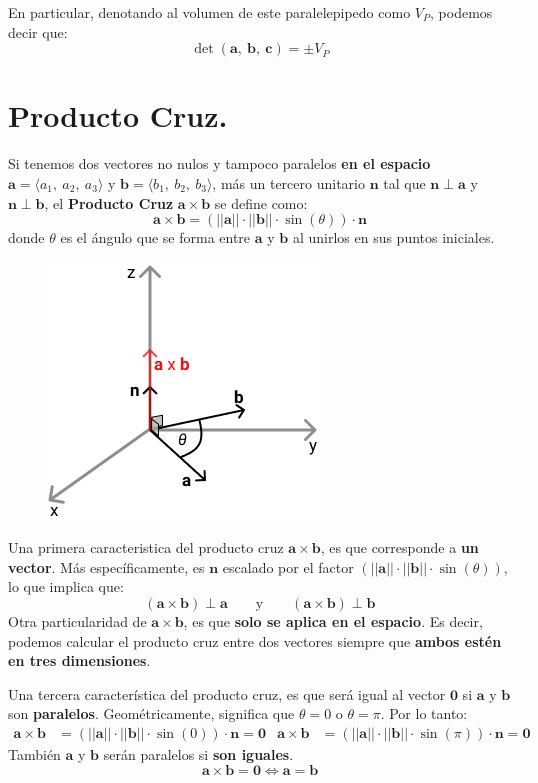 \documentclass[12pt]{article}
\begin{document}
En particular, denotando al volumen de este paralelepipedo como $V_{P}$, podemos decir que:
\[
  \det(\mathbf{a}, \ \mathbf{b}, \ \mathbf{c}) = \pm V_{P}
\]


\section{Producto Cruz.}

Si tenemos dos vectores no nulos y tampoco paralelos \textbf{en el espacio} $\mathbf{a} = \langle a_{1}, \ a_{2}, \ a_{3} \rangle$ y $\mathbf{b} = \langle b_{1}, \ b_{2}, \ b_{3} \rangle$, más un tercero unitario $\mathbf{n}$ tal que $\mathbf{n} \perp \mathbf{a}$ y $\mathbf{n} \perp \mathbf{b}$, el \textbf{Producto Cruz} $\mathbf{a} \times \mathbf{b}$ se define como:
\[
  \mathbf{a} \times \mathbf{b} = (||\mathbf{a}|| \cdot ||\mathbf{b}|| \cdot \sin(\theta)) \cdot \mathbf{n}
\]
donde $\theta$ es el ángulo que se forma entre $\mathbf{a}$ y $\mathbf{b}$ al unirlos en sus puntos iniciales.

\begin{figure}[hbt!]
\centering
\includegraphics[scale=0.5]{img/cross-product-1.jpg}
\end{figure}

Una primera caracteristica del producto cruz $\mathbf{a} \times \mathbf{b}$, es que corresponde a \textbf{un vector}. Más específicamente, es $\mathbf{n}$ escalado por el factor $(||\mathbf{a}|| \cdot ||\mathbf{b}|| \cdot \sin(\theta))$, lo que implica que:
\[
  (\mathbf{a} \times \mathbf{b}) \perp \mathbf{a} \qquad \text{y} \qquad (\mathbf{a} \times \mathbf{b}) \perp \mathbf{b}
\]
Otra particularidad de $\mathbf{a} \times \mathbf{b}$, es que \textbf{solo se aplica en el espacio}. Es decir, podemos calcular el producto cruz entre dos vectores siempre que \textbf{ambos estén en tres dimensiones}.

Una tercera característica del producto cruz, es que será igual al vector $\mathbf{0}$ si $\mathbf{a}$ y $\mathbf{b}$ son \textbf{paralelos}. Geométricamente, significa que $\theta = 0$ o $\theta = \pi$. Por lo tanto:
\begin{align*}
\mathbf{a} \times \mathbf{b} &= (||\mathbf{a}|| \cdot ||\mathbf{b}|| \cdot \sin(0)) \cdot \mathbf{n} = \mathbf{0} &
\mathbf{a} \times \mathbf{b} &= (||\mathbf{a}|| \cdot ||\mathbf{b}|| \cdot \sin(\pi)) \cdot \mathbf{n} = \mathbf{0}
\end{align*}
También $\mathbf{a}$ y $\mathbf{b}$ serán paralelos si \textbf{son iguales}.
\[
  \mathbf{a} \times \mathbf{b} = \mathbf{0} \iff \mathbf{a} = \mathbf{b}
\]
\end{document}
